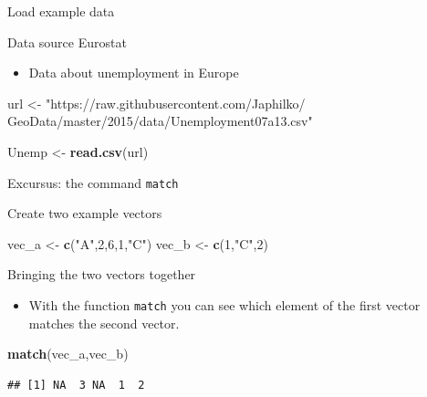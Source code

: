 \documentclass[
  ignorenonframetext,
]{beamer}
\newenvironment{Shaded}{\begin{snugshade}}{\end{snugshade}}
\newcommand{\DecValTok}[1]{\textcolor[rgb]{0.00,0.00,0.81}{#1}}
\newcommand{\KeywordTok}[1]{\textcolor[rgb]{0.13,0.29,0.53}{\textbf{#1}}}
\newcommand{\NormalTok}[1]{#1}
\newcommand{\StringTok}[1]{\textcolor[rgb]{0.31,0.60,0.02}{#1}}
\providecommand{\tightlist}{%
  \setlength{\itemsep}{0pt}\setlength{\parskip}{0pt}}
\begin{document}
\begin{frame}[fragile]{Load example data}
\protect\hypertarget{load-example-data}{}
\begin{block}{Data source Eurostat}
\protect\hypertarget{data-source-eurostat}{}
\begin{itemize}
\tightlist
\item
  Data about unemployment in Europe
\end{itemize}

\begin{Shaded}
\begin{Highlighting}[]
\NormalTok{url \textless{}{-}}\StringTok{ "https://raw.githubusercontent.com/Japhilko/}
\StringTok{GeoData/master/2015/data/Unemployment07a13.csv"}

\NormalTok{Unemp \textless{}{-}}\StringTok{ }\KeywordTok{read.csv}\NormalTok{(url) }
\end{Highlighting}
\end{Shaded}
\end{block}
\end{frame}

\begin{frame}[fragile]{Excursus: the command \texttt{match}}
\protect\hypertarget{excursus-the-command-match}{}
\begin{block}{Create two example vectors}
\protect\hypertarget{create-two-example-vectors}{}
\begin{Shaded}
\begin{Highlighting}[]
\NormalTok{vec\_a \textless{}{-}}\StringTok{ }\KeywordTok{c}\NormalTok{(}\StringTok{"A"}\NormalTok{,}\DecValTok{2}\NormalTok{,}\DecValTok{6}\NormalTok{,}\DecValTok{1}\NormalTok{,}\StringTok{"C"}\NormalTok{)}
\NormalTok{vec\_b \textless{}{-}}\StringTok{ }\KeywordTok{c}\NormalTok{(}\DecValTok{1}\NormalTok{,}\StringTok{"C"}\NormalTok{,}\DecValTok{2}\NormalTok{)}
\end{Highlighting}
\end{Shaded}
\end{block}

\begin{block}{Bringing the two vectors together}
\protect\hypertarget{bringing-the-two-vectors-together}{}
\begin{itemize}
\tightlist
\item
  With the function \texttt{match} you can see which element of the
  first vector matches the second vector.
\end{itemize}

\begin{Shaded}
\begin{Highlighting}[]
\KeywordTok{match}\NormalTok{(vec\_a,vec\_b)}
\end{Highlighting}
\end{Shaded}

\begin{verbatim}
## [1] NA  3 NA  1  2
\end{verbatim}
\end{block}
\end{frame}
\end{document}
